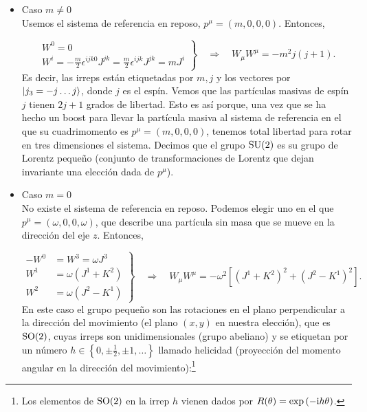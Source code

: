 \begin{itemize}
    \item Caso $m \neq 0$ \\
    
    Usemos el sistema de referencia en reposo, $p^\mu=(m, 0,0,0)$. Entonces,

    \begin{equation}
        \left.\begin{array}{l}
        W^0=0 \\
        W^i=-\frac{m}{2} \epsilon^{i j k 0} J^{j k}=\frac{m}{2} \epsilon^{i j k} J^{j k}=m J^i
        \end{array}\right\} \quad \Rightarrow \quad W_\mu W^\mu=-m^2 j(j+1) .
    \end{equation}
    Es decir, las irreps están etiquetadas por $m, j$ y los vectores por $\ket{j_3=-j \ldots j}$, donde $j$ es el espín. Vemos que las partículas masivas de espín $j$ tienen $2 j+1$ grados de libertad. Esto es así porque, una vez que se ha hecho un boost para llevar la partícula masiva al sistema de referencia en el que su cuadrimomento es $p^\mu=(m, 0,0,0)$, tenemos total libertad para rotar en tres dimensiones el sistema. Decimos que el grupo $\mathrm{SU}(2)$ es su grupo de Lorentz pequeño (conjunto de transformaciones de Lorentz que dejan invariante una elección dada de $p^\mu$).
    \vspace{0.5cm}

    \item Caso $m=0$\\
    
    No existe el sistema de referencia en reposo. Podemos elegir uno en el que $p^\mu=(\omega, 0,0, \omega)$, que describe una partícula sin masa que se mueve en la dirección del eje $z$. Entonces,

    \begin{equation}
        \left.\begin{array}{rl}
        -W^0 & =W^3=\omega J^3 \\
        W^1 & =\omega\left(J^1+K^2\right) \\
        W^2 & =\omega\left(J^2-K^1\right)
        \end{array}\right\} 
        \quad \Rightarrow \quad W_\mu W^\mu=-\omega^2\left[\left(J^1+K^2\right)^2+\left(J^2-K^1\right)^2\right].
    \end{equation}
    En este caso el grupo pequeño son las rotaciones en el plano perpendicular a la dirección del movimiento (el plano $(x, y)$ en nuestra elección), que es $\mathrm{SO}(2)$, cuyas irreps son unidimensionales (grupo abeliano) y se etiquetan por un número $h \in\left\{0, \pm \frac{1}{2}, \pm 1, \ldots\right\}$ llamado helicidad (proyección del momento angular en la dirección del movimiento):\footnote{Los elementos de $\mathrm{SO}(2)$ en la irrep $h$ vienen dados por $R(\theta) = \exp \qty( - \mathrm{i} h\theta)$.}


\end{itemize}
